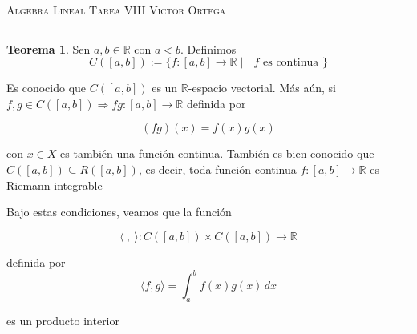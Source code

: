 \documentclass[12pt]{article}
\newcommand\R{\ensuremath{\mathbb{R}}}
\begin{document}
\thispagestyle{empty}

{\scshape Algebra Lineal} \hfill {\scshape \large Tarea VIII} \hfill {\scshape Victor Ortega}
 
\smallskip

\hrule

\bigskip

\bigskip

\theoremstyle{definition}
\newtheorem*{definition}{Definición}

\theoremstyle{definition}
\newtheorem*{remark}{Observación}

\theoremstyle{definition}
\newtheorem*{dem}{Demostración}

\theoremstyle{definition}
\newtheorem*{notation}{Notación}

\theoremstyle{definition}
\newtheorem*{theorem}{Teorema}

\theoremstyle{definition}
\newtheorem*{lema}{Lema}

\theoremstyle{definition}
\newtheorem*{corollary}{Corollary}

\theoremstyle{remark}
\newtheorem*{observation}{Observación}

\theoremstyle{remark}
\newtheorem*{example}{Ejemplo}



\begin{theorem}
    Sen $a,b \in \R$ con $a < b$. Definimos 
    \begin{equation*}
        C([a,b]) := \{ f: [a,b] \to \R \mid \text{ $f$ es continua }\}
    \end{equation*}

    Es conocido que $ C([a,b])$ es un $\R$-espacio vectorial. Más aún, si $f,g \in C([a,b]) \Rightarrow fg : [a,b] \to \R$ definida por

    \begin{equation*}
        (fg)(x) = f(x)g(x)
    \end{equation*}

    con $x \in X$ es también una función continua. También es bien conocido que $ C([a,b]) \subseteq  R([a,b])$, es decir, toda función continua $f:[a,b] \to \R$ es Riemann integrable

    Bajo estas condiciones, veamos que la función

    \begin{equation*}
        \langle \: , \: \rangle : C([a,b]) \times C([a,b]) \to \R
    \end{equation*}

    definida por
    \begin{equation*}
         \langle f , g \rangle = \int_{a}^{b} f(x)g(x) \, dx
    \end{equation*}

    es un producto interior 
\end{theorem}
\end{document}
